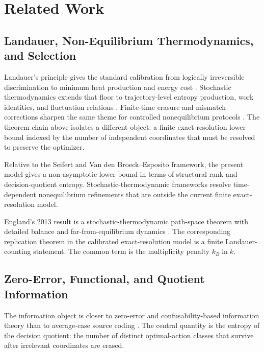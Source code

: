 \section{Related Work}\label{related-work}

\subsection{Landauer, Non-Equilibrium Thermodynamics, and Selection}

Landauer's principle gives the standard calibration from logically irreversible discrimination to minimum heat production and energy cost \cite{landauer1961irreversibility,bennett1982thermodynamics}. Stochastic thermodynamics extends that floor to trajectory-level entropy production, work identities, and fluctuation relations \cite{seifert2012stochastic,vandenbroeck2015ensemble,wolpert2019stochastic,jarzynski1997nonequilibrium,crooks1999entropy}. Finite-time erasure and mismatch corrections sharpen the same theme for controlled nonequilibrium protocols \cite{diana2013finite,proesmans2020finite,manzano2024absolute}. The theorem chain above isolates a different object: a finite exact-resolution lower bound indexed by the number of independent coordinates that must be resolved to preserve the optimizer.

Relative to the Seifert and Van den Broeck--Esposito framework, the present model gives a non-asymptotic lower bound in terms of structural rank and decision-quotient entropy. Stochastic-thermodynamic frameworks resolve time-dependent nonequilibrium refinements that are outside the current finite exact-resolution model.

England's 2013 result is a stochastic-thermodynamic path-space theorem with detailed balance and far-from-equilibrium dynamics \cite{england2013statistical}. The corresponding replication theorem in the calibrated exact-resolution model is a finite Landauer-counting statement. The common term is the multiplicity penalty $k_B \ln k$.

\subsection{Zero-Error, Functional, and Quotient Information}

The information object is closer to zero-error and confusability-based information theory than to average-case source coding \cite{shannon1956zero,korner1973graphs,lovasz1979shannon,csiszar2011information}. The central quantity is the entropy of the decision quotient: the number of distinct optimal-action classes that survive after irrelevant coordinates are erased.

